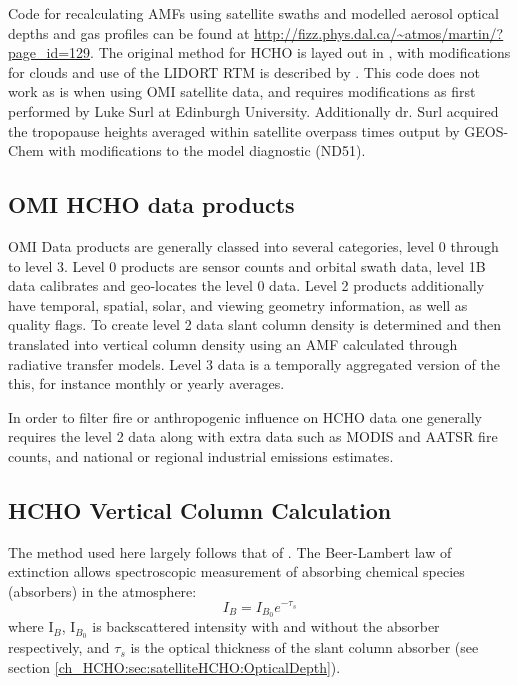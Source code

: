     Code for recalculating AMFs using satellite swaths and modelled aerosol optical depths and gas profiles can be found at \url{http://fizz.phys.dal.ca/~atmos/martin/?page_id=129}. 
    The original method for HCHO is layed out in \cite{Palmer2001}, with modifications for clouds \citep{Martin2003} and use of the LIDORT RTM \citep{Spurr2002} is described by \cite{Martin2003}.
    This code does not work as is when using OMI satellite data, and requires modifications as first performed by Luke Surl at Edinburgh University.
    Additionally dr. Surl acquired the tropopause heights averaged within satellite overpass times output by GEOS-Chem with modifications to the model diagnostic (ND51).
  
  \subsection{OMI HCHO data products}
    OMI Data products are generally classed into several categories, level 0 through to level 3. Level 0 products are sensor counts and orbital swath data, level 1B data calibrates and geo-locates the level 0 data. Level 2 products additionally have temporal, spatial, solar, and viewing geometry information, as well as quality flags.
    To create level 2 data slant column density is determined and then translated into vertical column density using an AMF calculated through radiative transfer models. Level 3 data is a temporally aggregated version of the this, for instance monthly or yearly averages.
    
    In order to filter fire or anthropogenic influence on HCHO data one generally requires the level 2 data along with extra data such as MODIS and AATSR fire counts, and national or regional industrial emissions estimates.
  
  \subsection{HCHO Vertical Column Calculation}
    \label{ch_HCHO:sec:satelliteHCHO:CalculationOfVC}
    
    The method used here largely follows that of \citet{Palmer2001}.
    The Beer-Lambert law of extinction allows spectroscopic measurement of absorbing chemical species (absorbers) in the atmosphere:
    \begin{equation} \label{ch_HCHO:eqn:beerlambert}
      I_B = I_{B_0} e^{-\tau_s}
    \end{equation}
    where I$_B$, I$_{B_0}$ is backscattered intensity with and without the absorber respectively, and $\tau_s$ is the optical thickness of the slant column absorber (see section \ref{ch_HCHO:sec:satelliteHCHO:OpticalDepth}).

